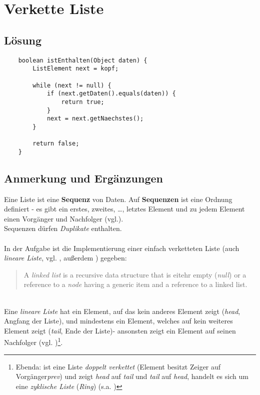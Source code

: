 \usepackage{csquotes}
\usepackage{lstmisc}\chapter{Verkette Liste}



\section{Lösung}

\begin{verbatim}
    boolean istEnthalten(Object daten) {
        ListElement next = kopf;

        while (next != null) {
            if (next.getDaten().equals(daten)) {
                return true;
            }
            next = next.getNaechstes();
        }

        return false;
    }
\end{verbatim}

\section{Anmerkung und Ergänzungen}

Eine Liste ist eine \textbf{Sequenz} von Daten.
Auf \textbf{Sequenzen} ist eine Ordnung definiert - es gibt ein erstes, zweites, \ldots, letztes Element und zu jedem Element einen Vorgänger und Nachfolger (vgl.\cite[63]{GD18c}).\\
Sequenzen dürfen \textit{Duplikate} enthalten.\\

\\
In der Aufgabe ist die Implementierung einer einfach verketteten Liste (auch \textit{lineare Liste}, vgl. \cite[238]{Knu97a}, außerdem \cite[73]{GD18c}) gegeben:\\

\blockquote[{\cite[142]{SW11}}]{
A \textit{linked list} is a recursive data structure that is eitehr empty (\textit{null}) or a reference to a \textit{node} having a generic item and a reference to a linked list.
}\\

\noindent
Eine \textit{lineare Liste} hat ein Element, auf das kein anderes Element zeigt (\textit{head}, Angfang der Liste), und mindestens ein Element, welches auf kein weiteres Element zeigt (\textit{tail}, Ende der Liste)- ansonsten zeigt ein Element auf seinen Nachfolger (vgl. \cite[259]{CL22})\footnote{
Ebenda: ist eine Liste \textit{doppelt verkettet} (Element besitzt Zeiger auf Vorgänger\textit{prev}) und zeigt \textit{head} auf \textit{tail} und \textit{tail} auf \textit{head}, handelt es sich um eine \textit{zyklische Liste} (\textit{Ring}) (s.a. \cite[105]{GD18c})
}.

